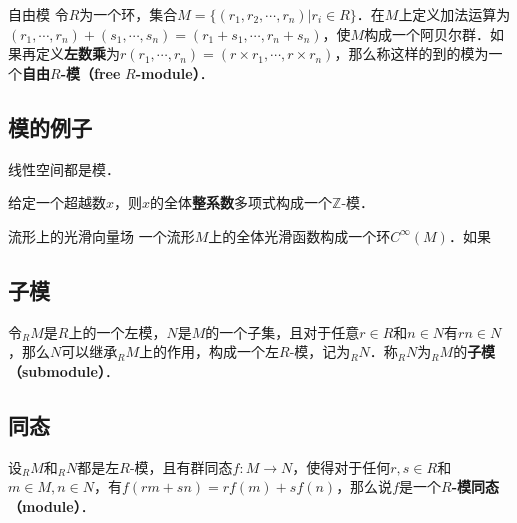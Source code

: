 \begin{definition}{自由模}
令$R$为一个环，集合$M=\{(r_1, r_2, \cdots, r_n)|r_i\in R\}$．在$M$上定义加法运算为$(r_1, \cdots, r_n)+(s_1, \cdots, s_n)=(r_1+s_1, \cdots, r_n+s_n)$，使$M$构成一个阿贝尔群．如果再定义\textbf{左数乘}为$r(r_1, \cdots, r_n)=(r\times r_1, \cdots, r\times r_n)$，那么称这样的到的模为一个\textbf{自由}$R$\textbf{-模（free} $R$\textbf{-module）}．
\end{definition}





\subsection{模的例子}

\begin{example}{}
线性空间都是模．
\end{example}

\begin{example}{}
给定一个超越数$x$，则$x$的全体\textbf{整系数}多项式构成一个$\mathbb{Z}$-模．
\end{example}

\begin{definition}{流形上的光滑向量场}
一个流形$M$上的全体光滑函数构成一个环$C^{\infty}(M)$．如果
\end{definition}


\subsection{子模}

令$_RM$是$R$上的一个左模，$N$是$M$的一个子集，且对于任意$r\in R$和$n\in N$有$rn\in N$，那么$N$可以继承$_RM$上的作用，构成一个左$R$-模，记为$_RN$．称$_RN$为$_RM$的\textbf{子模（submodule）}．


\subsection{同态}

设$_RM$和$_RN$都是左$R$-模，且有群同态$f:M\to N$，使得对于任何$r, s\in R$和$m\in M, n\in N$，有$f(rm+sn)=rf(m)+sf(n)$，那么说$f$是一个$R$\textbf{-模同态（module）}．











